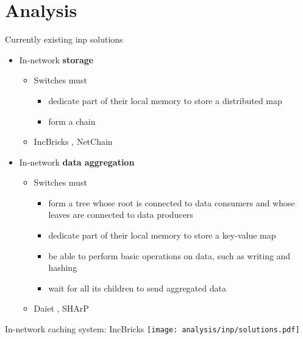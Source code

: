 \section{Analysis}

\begin{frame}{Currently existing \gls{inp} solutions}
  \begin{itemize}
    \item In-network \textbf{storage}
    \begin{itemize}
      \item Switches must
      \begin{itemize}
        \item dedicate part of their local memory to store a distributed map
        \item form a chain
      \end{itemize}
      \item IncBricks \cite{incbricks}, NetChain \cite{netchain}
    \end{itemize}
		\item In-network \textbf{data aggregation}
    \begin{itemize}
      \item Switches must
      \begin{itemize}
        \item form a tree whose root is connected to data consumers and whose leaves are connected to data producers
        \item dedicate part of their local memory to store a key-value map
        \item be able to perform basic operations on data, such as writing and hashing
        \item wait for all its children to send aggregated data
      \end{itemize}
      \item Daiet \cite{daiet}, SHArP \cite{sharp}
    \end{itemize}
	\end{itemize}
\end{frame}
\begin{frame}{In-network caching system: IncBricks}
  \centering
  \texttt{[image: analysis/inp/solutions.pdf]}
\end{frame}
